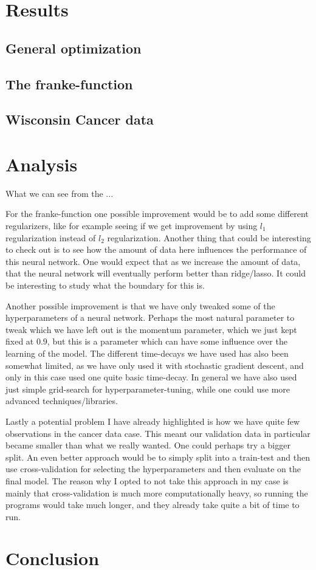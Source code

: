 \documentclass{article}
\begin{document}
\section{Results}

\subsection{General optimization}

\subsection{The franke-function}

\subsection{Wisconsin Cancer data}

\section{Analysis}
What we can see from the ...

For the franke-function one possible improvement would be to add some different
regularizers, like for example seeing if we get improvement by using $l_1$
regularization instead of $l_2$ regularization. Another thing that could be
interesting to check out is to see how the amount of data here influences the
performance of this neural network.  One would expect that as we increase the
amount of data, that the neural network will eventually perform better than
ridge/lasso. It could be interesting to study what the boundary for this is.

Another possible improvement is that we have only tweaked some of the
hyperparameters of a neural network. Perhaps the most natural parameter to tweak
which we have left out is the momentum parameter, which we just kept fixed at
$0.9$, but this is a parameter which can have some influence over the learning
of the model. The different time-decays we have used has also been somewhat
limited, as we have only used it with stochastic gradient descent, and only in
this case used one quite basic time-decay. In general we have also used just
simple grid-search for hyperparameter-tuning, while one could use more advanced
techniques/libraries.

Lastly a potential problem I have already highlighted is how we have quite few
observations in the cancer data case. This meant our validation data in
particular became smaller than what we really wanted. One could perhaps try a
bigger split. An even better approach would be to simply split into a train-test
and then use cross-validation for selecting the hyperparameters and then
evaluate on the final model. The reason why I opted to not take this approach in
my case is mainly that cross-validation is much more computationally heavy, so
running the programs would take much longer, and they already take quite a bit
of time to run.

\section{Conclusion}


\end{document}

